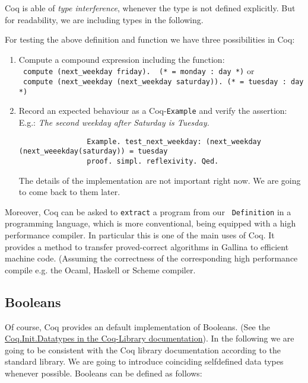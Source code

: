   Coq is able of {\itshape type  interference}, whenever the type is not defined explicitly.
  But for readability, we are including types in the following.
   
  For testing the above definition and function we have three possibilities in Coq:
     
   \begin{enumerate}
   \item Compute a compound expression including the function:\\
 		 \lstinline! compute (next_weekday friday).  (* = monday : day *)! or \\
   		 \lstinline! compute (next_weekday (next_weekday saturday)). (* = tuesday : day *)!
   \item Record an expected behaviour as a Coq-\lstinline!Example! and verify the assertion: 
         E.g.: {\itshape The second weekday after Saturday is Tuesday.}  
   
		   \begin{lstlisting}
		   		Example. test_next_weekday: (next_weekday (next_weeekday(saturday)) = tuesday 
		   		proof. simpl. reflexivity. Qed.
		   \end{lstlisting}
   			The details of the implementation are not important right now. We are going to come back to them later.
   \end{enumerate}   

    Moreover, Coq can be asked to \lstinline!extract! a program from our \lstinline! Definition! in a programming language, which is more conventional, being equipped with a high performance compiler.
    In particular this is one of the main uses of Coq. 
    It provides a method to transfer proved-correct algorithms in Gallina to efficient machine code.
    (Assuming the correctness of the corresponding high performance compile e.g. the Ocaml, Haskell or Scheme compiler. 


\subsection{Booleans}

    Of course, Coq provides an default implementation of Booleans.
    (See the \href{https://www.cs.princeton.edu/courses/archive/fall07/cos595/stdlib/html/Coq.Init.Datatypes.html}{Coq.Init.Datatypes in the Coq-Library documentation}).  
    In the following we are going to be consistent with the Coq library documentation according to the standard library.
    We are going to introduce coinciding selfdefined data types whenever possible.
    Booleans can be defined as follows:
    
